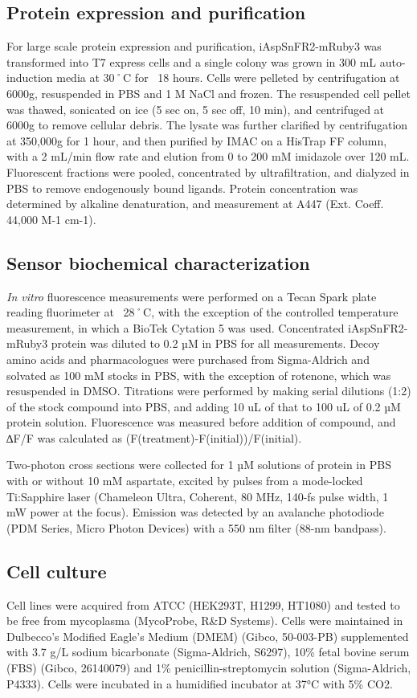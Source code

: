 \documentclass[9pt,lineno]{elife}
\begin{document}
\subsection{Protein expression and purification}
For large scale protein expression and purification, iAspSnFR2-mRuby3 was transformed into T7 express cells and a single colony was grown in 300 mL auto-induction media \citep{Studier2005-ki} at 30˚C for ~18 hours.
Cells were pelleted by centrifugation at 6000g, resuspended in PBS and 1 M NaCl and frozen.
The resuspended cell pellet was thawed, sonicated on ice (5 sec on, 5 sec off, 10 min), and centrifuged at 6000g to remove cellular debris.
The lysate was further clarified by centrifugation at 350,000g for 1 hour, and then purified by IMAC on a HisTrap FF column, with a 2 mL/min flow rate and elution from 0 to 200 mM imidazole over 120 mL.
Fluorescent fractions were pooled, concentrated by ultrafiltration, and dialyzed in PBS to remove endogenously bound ligands.
Protein concentration was determined by alkaline denaturation, and measurement at A447 (Ext. Coeff. 44,000 M-1 cm-1).

\subsection{Sensor biochemical characterization}
\textit{In vitro} fluorescence measurements were performed on a Tecan Spark plate reading fluorimeter at ~28˚C, with the exception of the controlled temperature measurement, in which a BioTek Cytation 5 was used.
Concentrated iAspSnFR2-mRuby3 protein was diluted to 0.2 µM in PBS for all measurements.
Decoy amino acids and pharmacologues were purchased from Sigma-Aldrich and solvated as 100 mM stocks in PBS, with the exception of rotenone, which was resuspended in DMSO.
Titrations were performed by making serial dilutions (1:2) of the stock compound into PBS, and adding 10 uL of that to 100 uL of 0.2 µM protein solution.
Fluorescence was measured before addition of compound, and ∆F/F was calculated as (F(treatment)-F(initial))/F(initial).

Two-photon cross sections were collected for 1 µM solutions of protein in PBS with or without 10 mM aspartate, excited by pulses from a mode-locked Ti:Sapphire laser (Chameleon Ultra, Coherent, 80 MHz, 140-fs pulse width, 1 mW power at the focus).
Emission was detected by an avalanche photodiode (PDM Series, Micro Photon Devices) with a 550 nm filter (88-nm bandpass).

\subsection{Cell culture}
Cell lines were acquired from ATCC (HEK293T, H1299, HT1080) and tested to be free from mycoplasma (MycoProbe, R\&D Systems).
Cells were maintained in Dulbecco’s Modified Eagle’s Medium (DMEM) (Gibco, 50-003-PB) supplemented with 3.7 g/L sodium bicarbonate (Sigma-Aldrich, S6297), 10\% fetal bovine serum (FBS) (Gibco, 26140079) and 1\% penicillin-streptomycin solution (Sigma-Aldrich, P4333).
Cells were incubated in a humidified incubator at 37°C with 5\% CO2.
\end{document}

